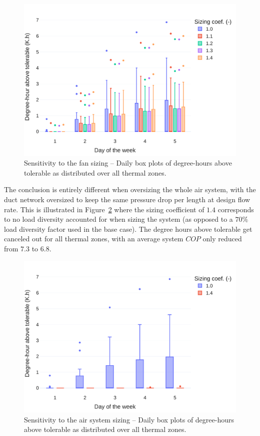 \begin{figure}[!htbp]
    \centering
    \includegraphics[width=.7\linewidth]{../python_scripts/figures/FanSizing.pdf}
    \caption{Sensitivity to the fan sizing -- Daily box plots of degree-hours above tolerable as distributed over all thermal zones.}
    \label{fig:fan}
\end{figure}

The conclusion is entirely different when oversizing the whole air system, with the duct network oversized to keep the same pressure drop per length at design flow rate. This is illustrated in Figure~\ref{fig:system} where the sizing coefficient of $1.4$ corresponds to no load diversity accounted for when sizing the system (as opposed to a $70\%$ load diversity factor used in the base case). The degree hours above tolerable get canceled out for all thermal zones, with an average system $COP$ only reduced from $7.3$ to $6.8$.

\begin{figure}[!htbp]
    \centering
    \includegraphics[width=.7\linewidth]{../python_scripts/figures/SystemSizing.pdf}
    \caption{Sensitivity to the air system sizing -- Daily box plots of degree-hours above tolerable as distributed over all thermal zones.}
    \label{fig:system}
\end{figure}


